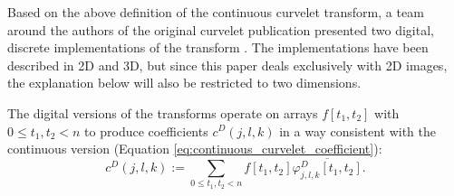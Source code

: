 Based on the above definition of the continuous curvelet transform, a team
around the authors of the original curvelet publication presented two digital,
discrete implementations of the transform \autocite{candes_fast_2006}. The
implementations have been described in 2D and 3D, but since this paper deals
exclusively with 2D images, the explanation below will also be restricted to
two dimensions.

The digital versions of the transforms operate on arrays $f[t_1, t_2]$ with $0
\leq t_1, t_2 < n$ to produce coefficients $c^D(j, l, k)$ in a way
consistent with the continuous version (Equation
\ref{eq:continuous_curvelet_coefficient}):
\begin{equation}
    c^D(j, l, k) := \sum_{0 \leq t_1, t_2 < n} f[t_1, t_2] \overline{\varphi_{j, l, k}^D[t_1, t_2]}.
\end{equation}






